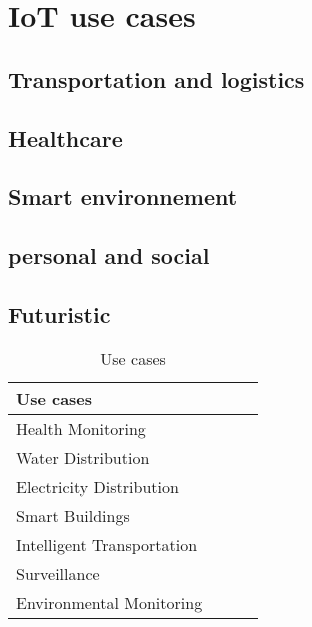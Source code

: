 \section{IoT use cases \cite{bregell_hardware_2015}} %
\label{sec:section_name}

\subsection{Transportation and logistics}
\subsection{Healthcare}
\subsection{Smart environnement}
\subsection{personal and social}
\subsection{Futuristic}





\begin{table}[h!]
\scriptsize
	\begin{tabular}{l|l|l|l}
	\textbf{Use cases}         &  &  & \\\hline
	Health Monitoring          &  &  & \\\hline
	Water Distribution         &  &  & \\\hline
	Electricity Distribution   &  &  & \\\hline
	Smart Buildings            &  &  & \\\hline
	Intelligent Transportation &  &  & \\\hline
	Surveillance               &  &  & \\\hline
	Environmental Monitoring   &  &  & \\
	\end{tabular}
	\caption{\label{tab:IoTUseCase} Use cases \cite{hancke_role_2012}}
\end{table}


